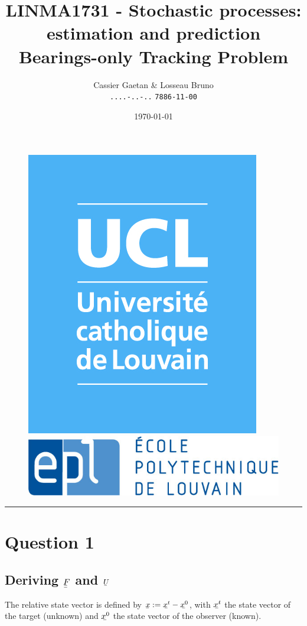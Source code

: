 \documentclass{article}
\title{LINMA1731 - Stochastic processes: estimation and prediction \\
	Bearings-only Tracking Problem}
\date{\today}
\author{Cassier Gaetan  \& Losseau Bruno \\
	\texttt{....-..-..} \hspace{2cm} \texttt{7886-11-00}}
\newcommand{\ubar}[1]{\underaccent{\bar}{#1}}
\begin{document}
\vspace{-.5cm}
\let\newpage\relax\maketitle
\vspace{-4cm}
\begin{figure}[h!]
\centering
\begin{minipage}{.5\textwidth}
  \flushleft \hspace{1cm}
  \includegraphics[width=.3\linewidth]{logo.jpg}
\end{minipage}%
\begin{minipage}{.5\textwidth}
  \flushright \hspace{-1cm}
  \includegraphics[width=.55\linewidth]{epl-logo.jpg}
\end{minipage}
\end{figure}
\rule{20cm}{1pt}



\section*{Question 1}
\subsection*{Deriving $\ubar{\ubar{F}}$ and $\ubar{U}$}
The relative state vector is defined by $\ubar{x} := \ubar{x^t} - \ubar{x^0}$, with $\ubar{x^t}$ the state vector of the target (unknown) and $\ubar{x^0}$ the state 
vector of the observer (known).
\end{document}

